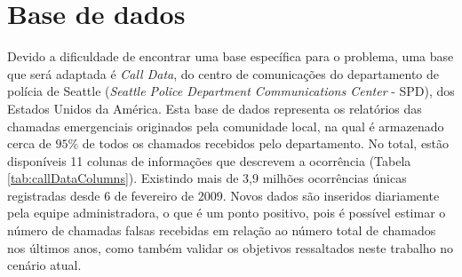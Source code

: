 \section{Base de dados}
Devido a dificuldade de encontrar uma base específica para o problema, uma base que será adaptada é \textit{Call Data}, do centro de comunicações do departamento de polícia de Seattle (\textit{Seattle Police Department Communications Center} - SPD), dos Estados Unidos da América. Esta base de dados representa os relatórios das chamadas emergenciais originados pela comunidade local, na qual é armazenado cerca de $95\%$ de todos os chamados recebidos pelo departamento. No total, estão disponíveis 11 colunas de informações que descrevem a ocorrência (Tabela \ref{tab:callDataColumns}). Existindo mais de 3,9 milhões ocorrências únicas registradas desde 6 de fevereiro de 2009. Novos dados são inseridos diariamente pela equipe administradora, o que é um ponto positivo, pois é possível estimar o número de chamadas falsas recebidas em relação ao número total de chamados nos últimos anos, como também validar os objetivos ressaltados neste trabalho no cenário atual.


